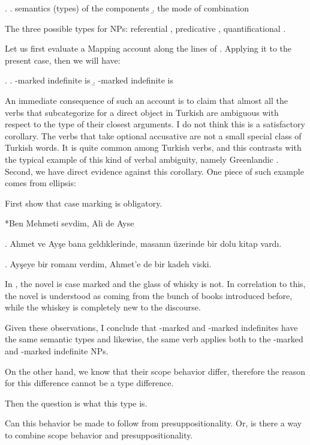\documentclass[11pt,a4paper]{article}
\begin{document}
\ex.
\a. semantics (types) of  the components
\b. the mode of combination


The three possible types for NPs: referential , predicative , quantificational . 

Let us first evaluate a Mapping account along the lines of . Applying it to the present case, then we will have:

\ex.
\a. \acc-marked indefinite is 
\b. \zero-marked indefinite is 


An immediate consequence of such an account is to claim that almost all the verbs that subcategorize for a direct object in Turkish are ambiguous with respect to the type of their closest arguments. I do not think this is a satisfactory corollary. The verbs that take optional accusative are not a small special class of Turkish words. It is quite common among Turkish verbs, and this contrasts with the typical example of this kind of verbal ambiguity, namely Greenlandic . Second, we have direct evidence against this corollary. One piece of such example comes from ellipsis:

First show that case marking is obligatory.

*Ben Mehmeti sevdim, Ali de Ayse

\ex. Ahmet ve Ayşe bana geldıklerinde, masanın üzerinde bir dolu kitap vardı.


\ex.\label{typeell} Ayşeye bir romanı verdim, Ahmet'e de bir kadeh viski.


In , the novel is case marked and the glass of whisky is not. In correlation to this, the novel is understood as coming from the bunch of books introduced before, while the whiskey is completely new to the discourse. 

Given these observations, I conclude that \acc-marked and \zero-marked indefinites have the same semantic types and likewise, the same verb applies both to the \acc-marked and \zero-marked indefinite NPs.

On the other hand, we know that their scope behavior differ, therefore the reason for this difference cannot be a type difference.    

Then the question is what this type is.

\begin{uquestion}
Can this behavior be made to follow from presuppositionality. Or, is there a way to combine scope behavior and presuppositionality.
\end{uquestion}
\end{document}
